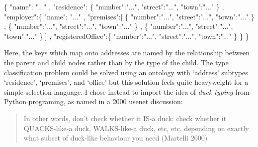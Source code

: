 \documentclass[]{article}
\newenvironment{Shaded}{}{}
\newcommand{\StringTok}[1]{\textcolor[rgb]{0.25,0.44,0.63}{{#1}}}
\newcommand{\NormalTok}[1]{{#1}}
\begin{document}
\begin{Shaded}
\begin{Highlighting}[]
\NormalTok{\{}
   \StringTok{"name"}\NormalTok{: }\StringTok{"..."}
\NormalTok{,  }\StringTok{"residence"}\NormalTok{: \{}
      \StringTok{"number"}\NormalTok{:}\StringTok{"..."}\NormalTok{, }\StringTok{"street"}\NormalTok{:}\StringTok{"..."}\NormalTok{, }\StringTok{"town"}\NormalTok{:}\StringTok{"..."} 
   \NormalTok{\}}
\NormalTok{,  }\StringTok{"employer"}\NormalTok{:\{}
      \StringTok{"name"}\NormalTok{: }\StringTok{"..."}
   \NormalTok{,  }\StringTok{"premises"}\NormalTok{:[}
         \NormalTok{\{ }\StringTok{"number"}\NormalTok{:}\StringTok{"..."}\NormalTok{, }\StringTok{"street"}\NormalTok{:}\StringTok{"..."}\NormalTok{, }\StringTok{"town"}\NormalTok{:}\StringTok{"..."} \NormalTok{\}}
      \NormalTok{,  \{ }\StringTok{"number"}\NormalTok{:}\StringTok{"..."}\NormalTok{, }\StringTok{"street"}\NormalTok{:}\StringTok{"..."}\NormalTok{, }\StringTok{"town"}\NormalTok{:}\StringTok{"..."} \NormalTok{\}}
      \NormalTok{,  \{ }\StringTok{"number"}\NormalTok{:}\StringTok{"..."}\NormalTok{, }\StringTok{"street"}\NormalTok{:}\StringTok{"..."}\NormalTok{, }\StringTok{"town"}\NormalTok{:}\StringTok{"..."} \NormalTok{\}}
      \NormalTok{]}
   \NormalTok{,  }\StringTok{"registeredOffice"}\NormalTok{:\{}
         \StringTok{"number"}\NormalTok{:}\StringTok{"..."}\NormalTok{, }\StringTok{"street"}\NormalTok{:}\StringTok{"..."}\NormalTok{, }\StringTok{"town"}\NormalTok{:}\StringTok{"..."}
      \NormalTok{\}}
   \NormalTok{\}}
\NormalTok{\}  }
\end{Highlighting}
\end{Shaded}

Here, the keys which map onto addresses are named by the relationship
between the parent and child nodes rather than by the type of the child.
The type classification problem could be solved using an ontology with
`address' subtypes `residence', `premises', and `office' but this
solution feels quite heavyweight for a simple selection language. I
chose instead to import the idea of \emph{duck typing} from Python
programing, as named in a 2000 usenet discussion:

\begin{quote}
In other words, don't check whether it IS-a duck: check whether it
QUACKS-like-a duck, WALKS-like-a duck, etc, etc, depending on exactly
what subset of duck-like behaviour you need (Martelli 2000)
\end{quote}
\end{document}
